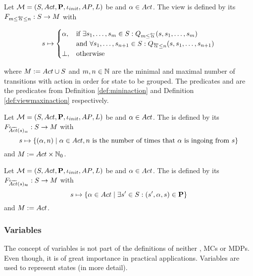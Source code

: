 \documentclass[preview]{standalone}
\begin{document}
\begin{definition}
	Let $\chgph = \chgphtuple$ be \chosengraphtypeN and $\action \in \actions$. The view 
	\viewspaninaction is defined by its \grpfctN $\gfctspaninaction : \states \to \arbset$ with
	
	\[
	\state \mapsto
	\begin{cases}
		\action,				& \text{if } \exists \state_1, \dots, \state_\numinactb \in \states: \predmininact[\numinactb] \\ &\text{and } \forall \state_1, \dots, \state_{\numinact+1} \in \states: \predmaxinact \\
		\remelem,          	& \text{otherwise}
	\end{cases}
	\]
	
	where $\imggrp := \actions \cup \remset$ and $\numinactb, \numinact \in \natnums$ are the minimal and maximal number of transitions with action \action in order for state to be grouped. The predicates \predmininact and \predmaxinact are the predicates from Definition \ref{def:mininaction} and Definition \ref{def:viewmaxinaction} respectively.
\end{definition}

\begin{definition}
	Let $\chgph = \chgphtuple$ be \chosengraphtypeN and $\action \in \actions$. The \viewN \viewstronginactident is defined by its \grpfctN $\gfctstronginactident : \states \to \imggrp$ with
	\[
	\state \mapsto	
	\{(\action, \numinact) \mid \action \in \actions, \numinact \text{ is the number of times that \action is ingoing from } \state\}
	\]
	and $\imggrp := \actions \times \natnums_0$.
\end{definition}

\begin{definition}
	Let $\chgph = \chgphtuple$ be \chosengraphtypeN and $\action \in \actions$. The \viewN \viewweakinactident is defined by its \grpfctN $\gfctweakinactident : \states \to \imggrp$ with
	\[
	\state \mapsto \{\action \in \actions \mid \exists \state' \in \states : (\state', \action, \state) \in \trans\} 	
	\]
	and $\imggrp := \actions$.
\end{definition}

\subsubsection{Variables}
The concept of variables is not part of the definitions of neither \chosengraphtypesN, MCs or MDPs. Even though, it is of great importance in practical applications. Variables are used to represent states (in more detail). 
\end{document}

